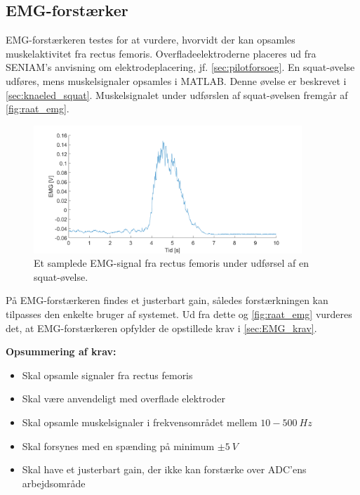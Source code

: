 \subsection{EMG-forstærker}

EMG-forstærkeren testes for at vurdere, hvorvidt der kan opsamles muskelaktivitet fra rectus femoris. Overfladeelektroderne placeres ud fra SENIAM's anvisning om elektrodeplacering, jf. \autoref{sec:pilotforsoeg}. En squat-øvelse udføres, mens muskelsignaler opsamles i MATLAB. Denne øvelse er beskrevet i \autoref{sec:knaeled_squat}. Muskelsignalet under udførslen af squat-øvelsen fremgår af \autoref{fig:raat_emg}. 

\begin{figure}[H]
\centering
\includegraphics[width=0.9\textwidth]{figures/raat_EMG_test}
\caption{Et samplede EMG-signal fra rectus femoris under udførsel af en squat-øvelse.}
\label{fig:raat_emg}
\end{figure}

\noindent
På EMG-forstærkeren findes et justerbart gain, således forstærkningen kan tilpasses den enkelte bruger af systemet. Ud fra dette og \autoref{fig:raat_emg} vurderes det, at EMG-forstærkeren opfylder de opstillede krav i \autoref{sec:EMG_krav}.

\textbf{Opsummering af krav:}
\begin{itemize}
\item[\Checkmark] Skal opsamle signaler fra rectus femoris
\item[\Checkmark] Skal være anvendeligt med overflade elektroder
\item[\Checkmark] Skal opsamle muskelsignaler i frekvensområdet mellem $10-500~Hz$
\item[\Checkmark] Skal forsynes med en spænding på minimum $\pm5~V$
\item[\Checkmark] Skal have et justerbart gain, der ikke kan forstærke over ADC'ens arbejdsområde
\end{itemize}


